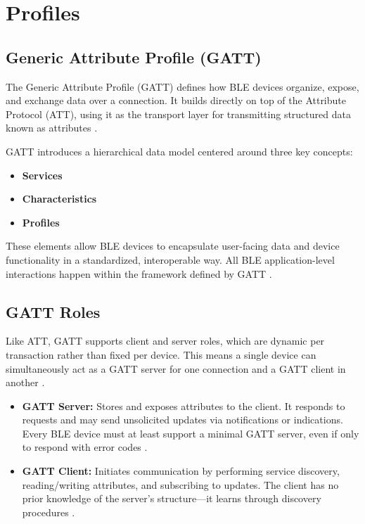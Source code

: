 \section{Profiles}

\subsection{Generic Attribute Profile (GATT)}

The Generic Attribute Profile (GATT) defines how BLE devices organize, expose, and exchange data over a connection. It builds directly on top of the Attribute Protocol (ATT), using it as the transport layer for transmitting structured data known as attributes \cite{introtoble}.

GATT introduces a hierarchical data model centered around three key concepts:
\begin{itemize}
    \item \textbf{Services}
    \item \textbf{Characteristics}
    \item \textbf{Profiles} \cite{introtoble}
\end{itemize}

These elements allow BLE devices to encapsulate user-facing data and device functionality in a standardized, interoperable way. All BLE application-level interactions happen within the framework defined by GATT \cite{gettingstartedwble}.

\subsection{GATT Roles}

Like ATT, GATT supports client and server roles, which are dynamic per transaction rather than fixed per device. This means a single device can simultaneously act as a GATT server for one connection and a GATT client in another \cite{introtoble}.

\begin{itemize}
    \item \textbf{GATT Server:} Stores and exposes attributes to the client. It responds to requests and may send unsolicited updates via notifications or indications. Every BLE device must at least support a minimal GATT server, even if only to respond with error codes \cite{gettingstartedwble}.
    \item \textbf{GATT Client:} Initiates communication by performing service discovery, reading/writing attributes, and subscribing to updates. The client has no prior knowledge of the server’s structure—it learns through discovery procedures \cite{gettingstartedwble}.
\end{itemize}

